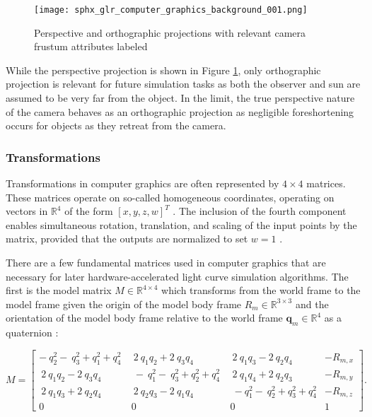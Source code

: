 \begin{figure}[!htb]
  \centering
  \texttt{[image: sphx\_glr\_computer\_graphics\_background\_001.png]}
  \caption{Perspective and orthographic projections with relevant camera frustum attributes labeled}
  \label{fig:ortho_perspective_cameras}
\end{figure}

While the perspective projection is shown in Figure \ref{fig:ortho_perspective_cameras}, only orthographic projection is relevant for future simulation tasks as both the observer and sun are assumed to be very far from the object. In the limit, the true perspective nature of the camera behaves as an orthographic projection as negligible foreshortening occurs for objects as they retreat from the camera. 

\subsubsection{Transformations} \label{sec:graphics_trans}

Transformations in computer graphics are often represented by $4 \times 4$ matrices. These matrices operate on so-called homogeneous coordinates, operating on vectors in $\mathbb{R}^4$ of the form $\left[ x, y, z, w \right]^T$ \cite{shirley2009}. The inclusion of the fourth component enables simultaneous rotation, translation, and scaling of the input points by the matrix, provided that the outputs are normalized to set $w = 1$ \cite{shirley2009}.

There are a few fundamental matrices used in computer graphics that are necessary for later hardware-accelerated light curve simulation algorithms. The first is the model matrix $M \in \mathbb{R}^{4 \times 4}$ which transforms from the world frame to the model frame given the origin of the model body frame $R_{m} \in \mathbb{R}^{3 \times 3}$ and the orientation of the model body frame relative to the world frame $\mathbf{q}_m \in \mathbb{R}^4$ as a quaternion \cite{shirley2009}:

\begin{equation} \label{eq:model_matrix}
  M = \begin{bmatrix}
    -\ q_2^2-\ q_3^2+q_1^2+q_4^2\ &\ 2\ q_1q_2+2\ q_3q_4&\ 2\ q_1q_3-2\ q_2q_4 & -R_{m,x}\\
    \ 2\ q_1q_2-2\ q_3q_4&\ -\ q_1^2-\ q_3^2+q_2^2+q_4^2\ &\ 2\ q_1q_4+2\ q_2q_3 & -R_{m,y}\\
    \ 2\ q_1q_3+2\ q_2q_4&\ 2\ q_2q_3-2\ q_1q_4&\ -q_1^2-\ q_2^2+q_3^2+q_4^2 & -R_{m,z} \\
    0 & 0 & 0 & 1
  \end{bmatrix}.
\end{equation}

